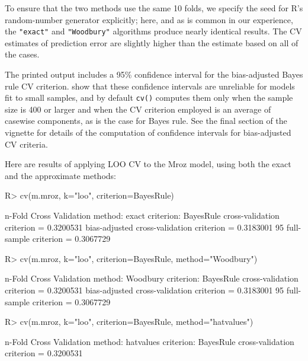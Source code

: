 \documentclass[
]{jss}
\begin{document}
To ensure that the two methods use the same 10 folds, we specify the
seed for R's random-number generator explicitly; here, and as is common
in our experience, the \texttt{"exact"} and \texttt{"Woodbury"}
algorithms produce nearly identical results. The CV estimates of
prediction error are slightly higher than the estimate based on all of
the cases.

The printed output includes a 95\% confidence interval for the
bias-adjusted Bayes rule CV criterion.
\citet{BatesHastieTibshirani:2023} show that these confidence intervals
are unreliable for models fit to small samples, and by default
\texttt{cv()} computes them only when the sample size is 400 or larger
and when the CV criterion employed is an average of casewise components,
as is the case for Bayes rule. See the final section of the vignette for
details of the computation of confidence intervals for bias-adjusted CV
criteria.

Here are results of applying LOO CV to the Mroz model, using both the
exact and the approximate methods:

\begin{CodeChunk}
\begin{CodeInput}
R> cv(m.mroz, k="loo", criterion=BayesRule)
\end{CodeInput}
\begin{CodeOutput}
n-Fold Cross Validation
method: exact
criterion: BayesRule
cross-validation criterion = 0.3200531
bias-adjusted cross-validation criterion = 0.3183001
95%
full-sample criterion = 0.3067729 
\end{CodeOutput}
\begin{CodeInput}
R> cv(m.mroz, k="loo", criterion=BayesRule, method="Woodbury")
\end{CodeInput}
\begin{CodeOutput}
n-Fold Cross Validation
method: Woodbury
criterion: BayesRule
cross-validation criterion = 0.3200531
bias-adjusted cross-validation criterion = 0.3183001
95%
full-sample criterion = 0.3067729 
\end{CodeOutput}
\begin{CodeInput}
R> cv(m.mroz, k="loo", criterion=BayesRule, method="hatvalues")
\end{CodeInput}
\begin{CodeOutput}
n-Fold Cross Validation
method: hatvalues
criterion: BayesRule
cross-validation criterion = 0.3200531
\end{CodeOutput}
\end{CodeChunk}
\end{document}
